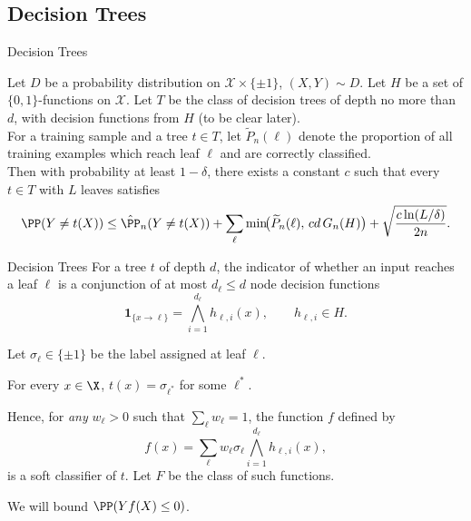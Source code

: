 \subsection{Decision Trees}

\begin{frame}{Decision Trees}
    \begin{mytheorem}
        \label{theorem:decision-tree-bound}
        Let $D$ be a probability distribution on $\mathcal{X}\times\{\pm1\}$, $(X,Y)\sim D$. Let \(H\) be a set of $\{0,1\}$-functions on $\mathcal{X}$. Let \(T\) be the class of decision trees of depth no more than \textcolor{gustave}{\(d\)}, with decision functions from \(H\) (to be clear later). \\
        
        For a training sample and a tree \(t\in T\), let \(\tilde P_n(\ell)\) denote the proportion of all training examples which reach leaf $\ell$ and are correctly classified. \\
        
        Then with probability at least \(1-\delta\), there exists a constant $c$ such that every \(t\in T\) with \textcolor{gustave}{\(L\)} leaves satisfies
\[
\PP(Y\ne t(X)) \le \hat{\PP}_n(Y\ne t(X)) +\sum_\ell \min\!\bigl(\widetilde P_n(\ell),\, c d\, G_n(H)\bigr)+\sqrt{\frac{c\ln(L/\delta)}{2n}}.
\]
    \end{mytheorem}
\end{frame}

\begin{frame}{Decision Trees}
    For a tree $t$ of depth \(d\), the indicator of whether an input reaches a leaf \(\ell\) is a conjunction of at most \(d_\ell\le d\) node decision functions 
\[
\mathbf{1}_{\{x\to \ell\}}
=
\bigwedge_{i=1}^{d_\ell} h_{\ell,i}(x),
\qquad h_{\ell,i}\in H.
\]

Let $\sigma_\ell\in\{\pm1\}$ be the label assigned at leaf $\ell$.

For every $x\in \X$, $t(x) = \sigma_{\ell^*}$ for some $\ell^*$.

Hence, for \textit{any} $w_\ell > 0$ such that $\sum_\ell w_\ell=1$, the function $f$ defined by
\[
f(x)=\sum_\ell w_\ell \sigma_\ell \bigwedge_{i=1}^{d_\ell} h_{\ell,i}(x),
\]
is a soft classifier of $t$. Let $F$ be the class of such functions. 

We will bound $\PP(Yf(X)\le 0)$.
\end{frame}

